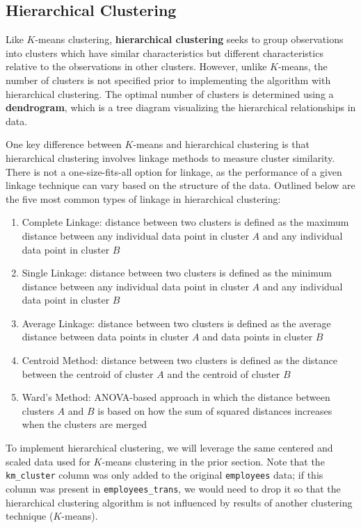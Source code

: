 \documentclass[
]{book}
\providecommand{\tightlist}{%
  \setlength{\itemsep}{0pt}\setlength{\parskip}{0pt}}
\begin{document}
\hypertarget{hierarchical-clustering}{%
\subsection{Hierarchical Clustering}\label{hierarchical-clustering}}

Like \(K\)-means clustering, \textbf{hierarchical clustering} seeks to group observations into clusters which have similar characteristics but different characteristics relative to the observations in other clusters. However, unlike \(K\)-means, the number of clusters is not specified prior to implementing the algorithm with hierarchical clustering. The optimal number of clusters is determined using a \textbf{dendrogram}, which is a tree diagram visualizing the hierarchical relationships in data.

One key difference between \(K\)-means and hierarchical clustering is that hierarchical clustering involves linkage methods to measure cluster similarity. There is not a one-size-fits-all option for linkage, as the performance of a given linkage technique can vary based on the structure of the data. Outlined below are the five most common types of linkage in hierarchical clustering:

\begin{enumerate}
\def\labelenumi{\arabic{enumi}.}
\tightlist
\item
  Complete Linkage: distance between two clusters is defined as the maximum distance between any individual data point in cluster \(A\) and any individual data point in cluster \(B\)
\item
  Single Linkage: distance between two clusters is defined as the minimum distance between any individual data point in cluster \(A\) and any individual data point in cluster \(B\)
\item
  Average Linkage: distance between two clusters is defined as the average distance between data points in cluster \(A\) and data points in cluster \(B\)
\item
  Centroid Method: distance between two clusters is defined as the distance between the centroid of cluster \(A\) and the centroid of cluster \(B\)
\item
  Ward's Method: ANOVA-based approach in which the distance between clusters \(A\) and \(B\) is based on how the sum of squared distances increases when the clusters are merged
\end{enumerate}

To implement hierarchical clustering, we will leverage the same centered and scaled data used for \(K\)-means clustering in the prior section. Note that the \texttt{km\_cluster} column was only added to the original \texttt{employees} data; if this column was present in \texttt{employees\_trans}, we would need to drop it so that the hierarchical clustering algorithm is not influenced by results of another clustering technique (\(K\)-means).
\end{document}
